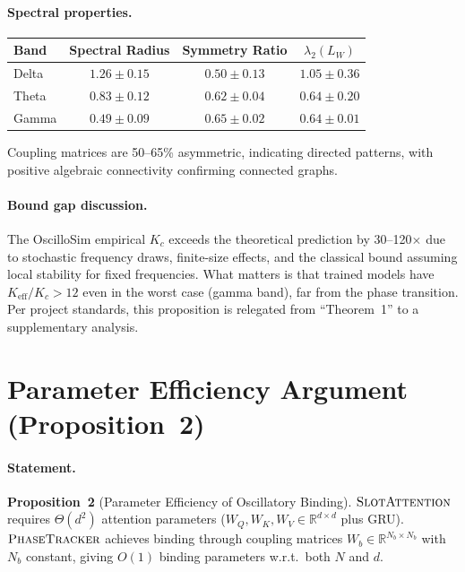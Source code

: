 \documentclass[11pt]{article}
\providecommand{\pt}{\textnormal{\textsc{PhaseTracker}}\xspace}
\providecommand{\sa}{\textnormal{\textsc{SlotAttention}}\xspace}
\begin{document}
\paragraph{Spectral properties.}

\begin{center}
\begin{tabular}{lccc}
\toprule
Band & Spectral Radius & Symmetry Ratio & $\lambda_2(L_W)$ \\
\midrule
Delta & $1.26 \pm 0.15$ & $0.50 \pm 0.13$ & $1.05 \pm 0.36$ \\
Theta & $0.83 \pm 0.12$ & $0.62 \pm 0.04$ & $0.64 \pm 0.20$ \\
Gamma & $0.49 \pm 0.09$ & $0.65 \pm 0.02$ & $0.64 \pm 0.01$ \\
\bottomrule
\end{tabular}
\end{center}

Coupling matrices are 50--65\% asymmetric, indicating directed patterns,
with positive algebraic connectivity confirming connected graphs.

\paragraph{Bound gap discussion.}
The OscilloSim empirical $K_c$ exceeds the theoretical prediction by
30--120$\times$ due to stochastic frequency draws, finite-size effects,
and the classical bound assuming local stability for fixed frequencies.
What matters is that trained models have $K_{\mathrm{eff}}/K_c > 12$
even in the worst case (gamma band), far from the phase transition.
Per project standards, this proposition is relegated from ``Theorem~1''
to a supplementary analysis.

\section{Parameter Efficiency Argument (Proposition~2)}
\label{app:param_efficiency_proof}

\paragraph{Statement.}
\textbf{Proposition~2} (Parameter Efficiency of Oscillatory Binding).
$\sa$ requires $\Theta(d^2)$ attention parameters
($W_Q, W_K, W_V \in \mathbb{R}^{d \times d}$ plus GRU).
$\pt$ achieves binding through coupling matrices
$W_b \in \mathbb{R}^{N_b \times N_b}$ with $N_b$ constant,
giving $O(1)$ binding parameters w.r.t.\ both $N$ and $d$.
\end{document}

